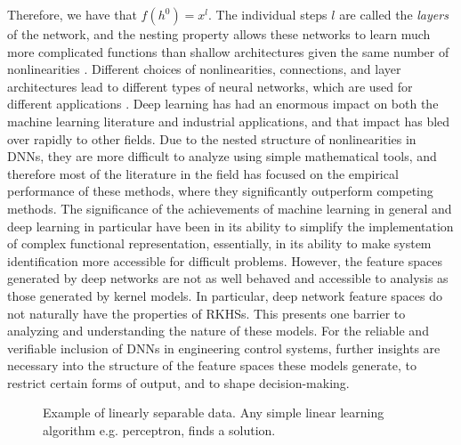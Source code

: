 \documentclass[letterpaper,12pt,peerreviewca,draftcls]{IEEEtran}
\begin{document}
Therefore, we have that $f(h^0) = x^l$. 
The individual steps $l$ are called the \emph{layers} of the network, and the nesting property allows these networks to learn much more complicated functions than shallow architectures given the same number of nonlinearities 
\cite{bengio2009learning}. Different choices of nonlinearities, connections, and layer architectures lead to different types of neural networks, which are used for different applications \cite{goodfellow2016deep}. Deep learning has had an enormous impact on both the machine learning literature and industrial applications, and that impact has bled over rapidly to other fields. Due to the nested structure of nonlinearities in DNNs, they are more difficult to analyze using simple mathematical tools, and therefore most of the literature in the field has focused on the empirical performance of these methods, where they significantly outperform competing methods.  The significance of the achievements of machine learning in general and deep learning in particular have been in its ability to simplify the implementation of complex functional representation, essentially, in its ability to make system identification more accessible for difficult problems. However, the feature spaces generated by deep networks are not as well behaved and accessible to analysis as those generated by kernel models. In particular, deep network feature spaces do not naturally have the properties of RKHSs.  This presents one barrier to analyzing and understanding the nature of these models. For the reliable and verifiable inclusion of DNNs in engineering control systems, %
further insights are necessary into the structure of the feature spaces
these models generate, to restrict certain forms of output, and to shape decision-making. 

\begin{figure}
\centering
    \caption{Example of linearly separable data. Any simple linear learning algorithm e.g. perceptron, finds a solution.}
    \label{fig:linsep}
 \end{figure} 
\end{document}
